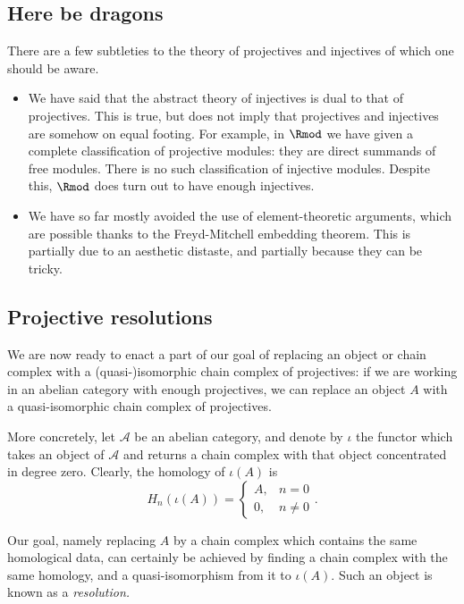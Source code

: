\documentclass[main.tex]{subfiles}
\begin{document}
\subsection{Here be dragons}
\label{ssc:here_be_dragons}

There are a few subtleties to the theory of projectives and injectives of which one should be aware.
\begin{itemize}
  \item We have said that the abstract theory of injectives is dual to that of projectives. This is true, but does not imply that projectives and injectives are somehow on equal footing. For example, in $\Rmod$ we have given a complete classification of projective modules: they are direct summands of free modules. There is no such classification of injective modules. Despite this, $\Rmod$ does turn out to have enough injectives.

  \item We have so far mostly avoided the use of element-theoretic arguments, which are possible thanks to the Freyd-Mitchell embedding theorem. This is partially due to an aesthetic distaste, and partially because they can be tricky.
\end{itemize}

\subsection{Projective resolutions}
\label{ssc:projective_resolutions}

We are now ready to enact a part of our goal of replacing an object or chain complex with a (quasi-)isomorphic chain complex of projectives: if we are working in an abelian category with enough projectives, we can replace an object $A$ with a quasi-isomorphic chain complex of projectives.

More concretely, let $\mathcal{A}$ be an abelian category, and denote by $\iota$ the functor which takes an object of $\mathcal{A}$ and returns a chain complex with that object concentrated in degree zero. Clearly, the homology of $\iota(A)$ is
\begin{equation*}
  H_{n}(\iota(A)) =
  \begin{cases}
    A, &n = 0 \\
    0, &n \neq 0
  \end{cases}.
\end{equation*}

Our goal, namely replacing $A$ by a chain complex which contains the same homological data, can certainly be achieved by finding a chain complex with the same homology, and a quasi-isomorphism from it to $\iota(A)$. Such an object is known as a \emph{resolution.}
\end{document}
